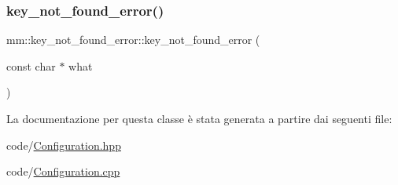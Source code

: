\subsubsection{\texorpdfstring{key\+\_\+not\+\_\+found\+\_\+error()}{key\_not\_found\_error()}\hspace{0.1cm}{\footnotesize\ttfamily [2/2]}}
{\footnotesize\ttfamily mm\+::key\+\_\+not\+\_\+found\+\_\+error\+::key\+\_\+not\+\_\+found\+\_\+error (\begin{DoxyParamCaption}\item[{const char $\ast$}]{what }\end{DoxyParamCaption})}



La documentazione per questa classe è stata generata a partire dai seguenti file\+:\begin{DoxyCompactItemize}
\item 
code/\mbox{\hyperlink{_configuration_8hpp}{Configuration.\+hpp}}\item 
code/\mbox{\hyperlink{_configuration_8cpp}{Configuration.\+cpp}}\end{DoxyCompactItemize}
